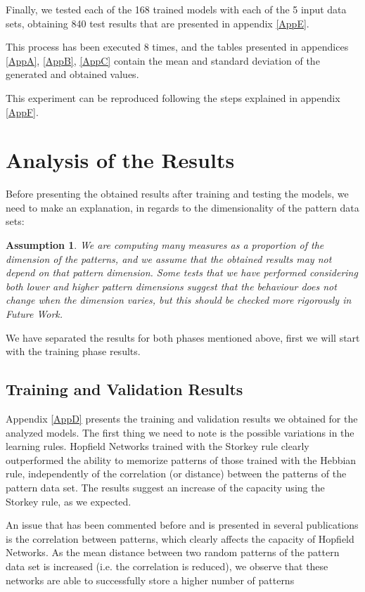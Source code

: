\documentclass[anon]{CI}
\newtheorem{assumption}{Assumption}
\begin{document}
Finally, we tested each of the 168 trained models with each of the 5 input data sets, obtaining 840 test results that are presented in appendix \ref{AppE}.

This process has been executed 8 times, and the tables presented in appendices \ref{AppA}, \ref{AppB}, \ref{AppC} contain the mean and standard deviation of the generated and obtained values.

This experiment can be reproduced following the steps explained in appendix \ref{AppF}.

\section{Analysis of the Results}

Before presenting the obtained results after training and testing the models, we need to make an explanation, in regards to the dimensionality of the pattern data sets:

\begin{assumption} We are computing many measures as a proportion of the dimension of the patterns, and we assume that the obtained results may not depend on that pattern dimension. Some tests that we have performed considering both lower and higher pattern dimensions suggest that the behaviour does not change when the dimension varies, but this should be checked more rigorously in Future Work.
\end{assumption}

We have separated the results for both phases mentioned above, first we will start with the training phase results.

\subsection{Training and Validation Results}
Appendix \ref{AppD} presents the training and validation results we obtained for the analyzed models. The first thing we need to note is the possible variations in the learning rules. Hopfield Networks trained with the Storkey rule clearly outperformed the ability to memorize patterns of those trained with the Hebbian rule, independently of the correlation (or distance) between the patterns of the pattern data set. The results suggest an increase of the capacity using the Storkey rule, as we expected.

An issue that has been commented before and is presented in several publications is the correlation between patterns, which clearly affects the capacity of Hopfield Networks. As the mean distance between two random patterns of the pattern data set is increased (i.e. the correlation is reduced), we observe that these networks are able to successfully store a higher number of patterns 
\end{document}
